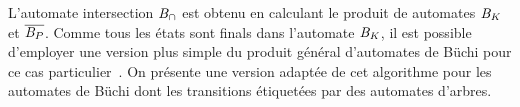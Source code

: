 


L'automate intersection $\mathit B_\cap$ est obtenu en calculant le produit de automates $\mathit B_\mathit K$ et $\overline{\mathit B_P}$.
Comme tous les états sont finals dans l'automate $\mathit B_\mathit K$, il est possible d'employer une version plus
simple du produit général d'automates de Büchi pour ce cas particulier~\cite{MC-Book}. On présente une version
adaptée de cet algorithme pour les automates de Büchi dont les transitions étiquetées par des automates d'arbres.

